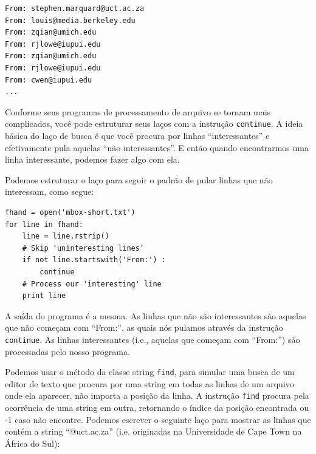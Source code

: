 \beforeverb
\begin{verbatim}
From: stephen.marquard@uct.ac.za
From: louis@media.berkeley.edu
From: zqian@umich.edu
From: rjlowe@iupui.edu
From: zqian@umich.edu
From: rjlowe@iupui.edu
From: cwen@iupui.edu
...
\end{verbatim}
\afterverb

Conforme seus programas de processamento de arquivo se tornam mais 
complicados, você pode estruturar seus laços com a instrução 
{\tt continue}. A ideia básica do laço de busca é que você procura
por linhas ``interessantes'' e efetivamente pula aquelas ``não interessantes''.
E então quando encontrarmos uma linha interessante, podemos fazer algo com ela.

Podemos estruturar o laço para seguir o padrão de
pular linhas que não interessam, como segue:

\beforeverb
\begin{verbatim}
fhand = open('mbox-short.txt')
for line in fhand:
    line = line.rstrip()
    # Skip 'uninteresting lines'
    if not line.startswith('From:') :
        continue
    # Process our 'interesting' line
    print line
\end{verbatim}
\afterverb

A saída do programa é a mesma. As linhas que não são
interessantes são aquelas que não começam com ``From:'',
as quais nós pulamos através da instrução {\tt continue}.
As linhas interessantes (i.e., aquelas que começam com ``From:'')
são processadas pelo nosso programa.

Podemos usar o método da classe string {\tt find}, para simular
uma busca de um editor de texto que procura por uma string em todas
as linhas de um arquivo onde ela aparecer, não importa a posição da
linha. A instrução {\tt find} procura pela ocorrência de uma string 
em outra, retornando o índice da posição encontrada ou -1 caso não 
encontre. Podemos escrever o seguinte laço para mostrar as linhas que
contém a string ``@uct.ac.za'' (i.e. originadas na Universidade de
Cape Town na África do Sul):

